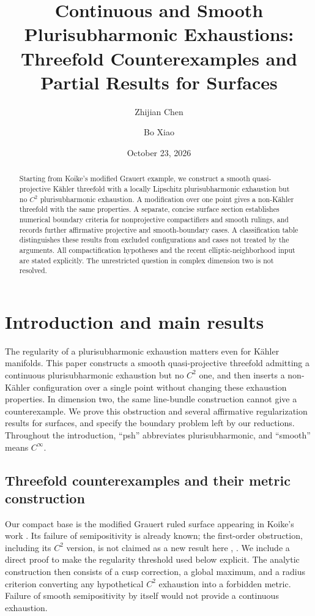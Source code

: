 \documentclass[11pt]{amsart}
\title[Continuous and smooth plurisubharmonic exhaustions]{Continuous and Smooth
Plurisubharmonic Exhaustions:\\
Threefold Counterexamples and Partial Results for Surfaces}
\author{Zhijian Chen}
\author{Bo Xiao}
\date{October 23, 2026}
\theoremstyle{definition}
\theoremstyle{remark}
\numberwithin{equation}{section}
\begin{document}
\begin{abstract}
Starting from Koike's modified Grauert example, we construct a smooth
quasi-projective K\"ahler threefold with a locally Lipschitz
plurisubharmonic exhaustion but no $C^2$ plurisubharmonic exhaustion.
A modification over one point gives a non-K\"ahler threefold with the
same properties. A separate, concise surface section establishes
numerical boundary criteria for nonprojective compactifiers and smooth
rulings, and records further affirmative projective and smooth-boundary
cases. A classification table distinguishes these results from
excluded configurations and cases not treated by the arguments.
All compactification hypotheses and the recent elliptic-neighborhood
input are stated explicitly. The unrestricted question in complex
dimension two is not resolved.
\end{abstract}

\maketitle

\section{Introduction and main results}\label{sec:intro}

The regularity of a plurisubharmonic exhaustion matters even for
K\"ahler manifolds. This paper constructs a smooth quasi-projective
threefold admitting a continuous plurisubharmonic exhaustion but no
$C^2$ one, and then inserts a non-K\"ahler configuration over a single
point without changing these exhaustion properties. In dimension two,
the same line-bundle construction cannot give a counterexample. We
prove this obstruction and several affirmative regularization results
for surfaces, and specify the boundary problem left by our reductions.
Throughout the introduction, ``psh'' abbreviates plurisubharmonic, and
``smooth'' means $C^\infty$.

\subsection{Threefold counterexamples and their metric construction}

Our compact base is the modified Grauert ruled surface appearing in
Koike's work \cite[Example~4.1]{Koike2021}. Its failure of semipositivity
is already known; the first-order obstruction, including its $C^2$
version, is not claimed as a new result here
\cite[Theorem~1.4 and Example~4.1]{Koike2021},
\cite[Remark~2.8]{Wu2026}. We include a direct proof to make the
regularity threshold used below explicit. The analytic construction
then consists of a cusp correction, a global maximum, and a radius
criterion converting any hypothetical $C^2$ exhaustion into a
forbidden metric. Failure of smooth semipositivity by itself would
not provide a continuous exhaustion.
\end{document}
